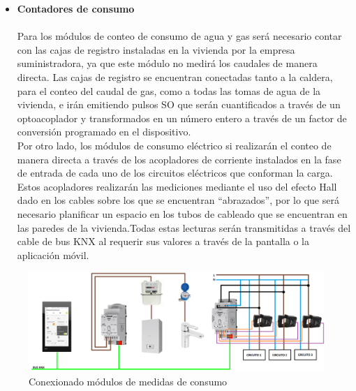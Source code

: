 \begin{itemize}
\item \textbf{Contadores de consumo} \\ \\
Para los módulos de conteo de consumo de agua y gas será necesario contar con las cajas de registro instaladas en la vivienda por la empresa suministradora, ya que este módulo no medirá los caudales de manera directa. Las cajas de registro se encuentran conectadas tanto a la caldera, para el conteo del caudal de gas, como a todas las tomas de agua de la vivienda, e irán emitiendo pulsos SO que serán cuantificados a través de un optoacoplador y transformados en un número entero a través de un factor de conversión programado en el dispositivo. \\
Por otro lado, los módulos de consumo eléctrico si realizarán el conteo de manera directa a través de los acopladores de corriente instalados en la fase de entrada de cada uno de los circuitos eléctricos que conforman la carga. Estos acopladores realizarán las mediciones mediante el uso del efecto Hall dado en los cables sobre los que se encuentran “abrazados”, por lo que será necesario planificar un espacio en los tubos de cableado que se encuentran en las paredes de la vivienda.Todas estas lecturas serán transmitidas a través del cable de bus KNX al requerir sus valores a través de la pantalla o la aplicación móvil.
\end{itemize}
\begin{flushleft}
\begin{figure}[H]
\includegraphics[width=1.15\textwidth]{figures/conex_consumo.png}   
\caption{Conexionado módulos de medidas de consumo}
\label{fig:conex_consumo}
\end{figure}
\end{flushleft}

